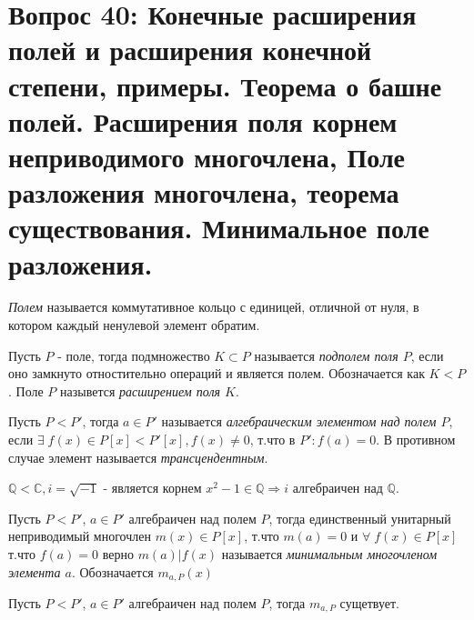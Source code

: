 \section{Вопрос 40: Конечные расширения полей и расширения конечной степени, примеры. Теорема о башне полей. Расширения поля корнем неприводимого многочлена, Поле разложения многочлена, теорема существования. Минимальное поле разложения.
}

\begin{defs}[Поле]
  \textit{Полем} называется коммутативное кольцо с единицей, отличной от нуля, в котором каждый ненулевой элемент обратим.
\end{defs}

\begin{defs}[Подполе]
  Пусть $P$ - поле, тогда подмножество $K \subset P$ называется \textit{подполем поля $P$}, если оно замкнуто отностительно операций и является полем.
  Обозначается как $K < P$.
  Поле $P$ назывется \textit{расширением поля $K$}.
\end{defs}

\begin{defs}
  Пусть $P < P'$, тогда $a \in P'$ называется \textit{алгебраическим элементом над полем $P$}, если $\exists\; f(x) \in P[x] < P'[x], f(x) \neq 0$, т.что в $P':f(a) = 0$. В противном случае элемент называется \textit{трансцендентным}.
\end{defs}

\begin{example}
    $\mathbb{Q}<\mathbb{C}, i = \sqrt{-1}$ - является корнем $x^2 - 1 \in \mathbb{Q} \Rightarrow i$ алгебраичен над $\mathbb{Q}$.
\end{example}

\begin{defs}
  Пусть $P < P'$,  $a \in P'$ алгебраичен над полем $P$, тогда единственный унитарный неприводимый многочлен
  $m(x) \in P[x]$, т.что $ m(a) = 0$ и $\forall \; f(x) \in P[x]$ т.что $f(a) = 0 $ верно $m(a) | f(x) $ называется \textit{минимальным многочленом элемента $a$}.
  Обозначается $m_{a,P}(x)$
\end{defs}

\begin{proofs}
	Пусть $P < P'$,  $a \in P'$ алгебраичен над полем $P$, тогда $m_{a,P}$ сущетвует.
\end{proofs}

